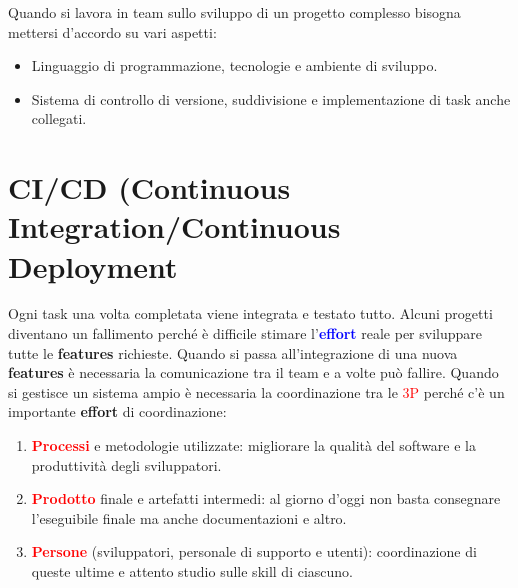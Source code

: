 Quando si lavora in team sullo sviluppo di un progetto complesso bisogna mettersi d'accordo su vari aspetti:
\begin{itemize}
    \item Linguaggio di programmazione, tecnologie e ambiente di sviluppo.
    \item Sistema di controllo di versione, suddivisione e implementazione di task anche collegati.
\end{itemize}

\section{CI/CD (Continuous Integration/Continuous Deployment}
Ogni task una volta completata viene integrata e testato tutto.
Alcuni progetti diventano un fallimento perché è difficile stimare l'\textbf{\textcolor{blue}{effort}} reale per sviluppare tutte le \textbf{features} richieste. Quando si passa all'integrazione di una nuova \textbf{features} è necessaria la comunicazione tra il team e a volte può fallire.
Quando si gestisce un sistema ampio è necessaria la coordinazione tra le \textcolor{red}{3P} perché c'è un importante \textbf{effort} di coordinazione:
\begin{enumerate}
    \item \textbf{\textcolor{red}{Processi}} e metodologie utilizzate: migliorare la qualità del software e la produttività degli sviluppatori.
    \item \textbf{\textcolor{red}{Prodotto}} finale e artefatti intermedi: al giorno d'oggi non basta consegnare l'eseguibile finale ma anche documentazioni e altro.
    \item \textbf{\textcolor{red}{Persone}} (sviluppatori, personale di supporto e utenti): coordinazione di queste ultime e attento studio sulle skill di ciascuno.
\end{enumerate}


